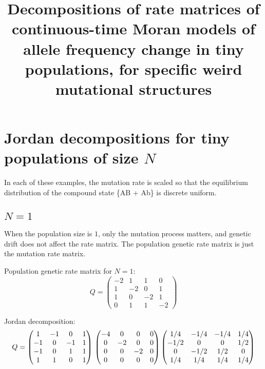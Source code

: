 \documentclass{article}
\theoremstyle{plain}
\theoremstyle{definition}
\begin{document}
\title
{
	Decompositions of rate matrices of continuous-time Moran
	models of allele frequency change in tiny populations,
	for specific weird mutational structures
}
\maketitle

\section{Jordan decompositions for tiny populations of size $N$}

In each of these examples,
the mutation rate is scaled so that the equilibrium distribution
of the compound state \{AB + Ab\} is discrete uniform.

\subsection{$N=1$}

When the population size is $1$, only the mutation process matters,
and genetic drift does not affect the rate matrix.
The population genetic rate matrix is just the mutation rate matrix.

Population genetic rate matrix for $N = 1$:
\begin{equation}
	Q =
	\begin{pmatrix}
		-2 & 1 & 1 & 0 \\
		1 & -2 & 0 & 1 \\
		1 & 0 & -2 & 1 \\
		0 & 1 & 1 & -2
	\end{pmatrix}
\end{equation}

Jordan decomposition:
\begin{equation}
	Q =
	\begin{pmatrix}
		1 & -1 & 0 & 1 \\
		-1 & 0 & -1 & 1 \\
		-1 & 0 & 1 & 1 \\
		1 & 1 & 0 & 1
	\end{pmatrix} \\
	\begin{pmatrix}
		-4 & 0 & 0 & 0 \\
		0 & -2 & 0 & 0 \\
		0 & 0 & -2 & 0 \\
		0 & 0 & 0 & 0
	\end{pmatrix}
	\begin{pmatrix}
		1/4 & -1/4 & -1/4 & 1/4 \\
		-1/2 & 0 & 0 & 1/2 \\
		0 & -1/2 & 1/2 & 0 \\
		1/4 & 1/4 & 1/4 & 1/4
	\end{pmatrix}
\end{equation}
\end{document}
